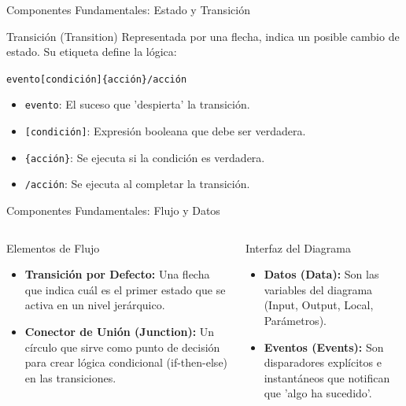 \documentclass[aspectratio=169,xcolor=dvipsnames]{beamer}
\begin{document}
\begin{frame}{Componentes Fundamentales: Estado y Transición}
\begin{alertblock}{Transición (Transition)}
            Representada por una flecha, indica un posible cambio de estado. Su etiqueta define la lógica:
            \begin{center}
            \texttt{evento[condición]\{acción\}/acción}
            \end{center}
                \begin{itemize}
                    \item \texttt{evento}: El suceso que 'despierta' la transición.
                    \item \texttt{[condición]}: Expresión booleana que debe ser verdadera.
                    \item \texttt{\{acción\}}: Se ejecuta si la condición es verdadera.
                    \item \texttt{/acción}: Se ejecuta al completar la transición.
                \end{itemize}
            \end{alertblock}
\end{frame}
\begin{frame}{Componentes Fundamentales: Flujo y Datos}
    \begin{columns}[t]
            \begin{block}{Elementos de Flujo}
                \begin{itemize}
                    \item \textbf{Transición por Defecto:} Una flecha que indica cuál es el primer estado que se activa en un nivel jerárquico.
                    \item \textbf{Conector de Unión (Junction):} Un círculo que sirve como punto de decisión para crear lógica condicional (if-then-else) en las transiciones.
                \end{itemize}
            \end{block}
        
            \begin{alertblock}{Interfaz del Diagrama}
                 \begin{itemize}
                    \item \textbf{Datos (Data):} Son las variables del diagrama (Input, Output, Local, Parámetros).
                    \item \textbf{Eventos (Events):} Son disparadores explícitos e instantáneos que notifican que 'algo ha sucedido'.
                \end{itemize}
            \end{alertblock}
    \end{columns}
\end{frame}
\end{document}
